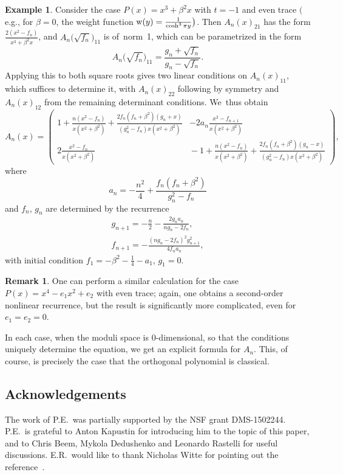\documentclass[10pt,a4paper]{amsart}
\theoremstyle{definition}
\newtheorem{Example}[Theorem]{Example}
\newtheorem{Remark}[Theorem]{Remark}
\numberwithin{equation}{section}
\begin{document}
\begin{Example}
 Consider the case $P(x)=x^3+\beta^2x$ with $t=-1$ and even trace $\big($e.g., for
 $\beta=0$, the weight function ${\rm w}(y)=\frac{1}{\cosh^3 \pi y}\big)$. Then $A_n(x)_{21}$
 has the form $\frac{2(x^2-f_n)}{x^3+\beta^2x}$, and $A_n\big(\sqrt{f_n}\big)_{11}$ is of~norm~1, which can be parametrized in the form
 \[
 A_n\big(\sqrt{f_n}\big)_{11} = \frac{g_n+\sqrt{f_n}}{g_n-\sqrt{f_n}}.
 \]
 Applying this to both square roots gives two linear conditions on
 $A_n(x)_{11}$, which suffices to determine it, with $A_n(x)_{22}$
 following by symmetry and $A_n(x)_{12}$ from the remaining determinant
 conditions. We~thus obtain
 \[
 A_n(x)
 =
 \begin{pmatrix}
 \displaystyle 1 \!+\! \frac{n(x^2\!-\!f_n)}{x(x^2\!+\!\beta^2)}
 \!+\! \frac{2f_n(f_n\!+\!\beta^2)(g_n\!+\!x)}{(g_n^2\!-\!f_n)x(x^2\!+\!\beta^2)}
 &\displaystyle
 -2 a_n \frac{x^2-f_{n+1}}{x(x^2+\beta^2)}
 \\[2ex]
 \displaystyle 2 \frac{x^2-f_n}{x(x^2+\beta^2)}
 &\displaystyle
 \!-\!1 \!+\! \frac{n(x^2\!-\!f_n)}{x(x^2\!+\!\beta^2)} \!+\! \frac{2f_n(f_n\!+\!\beta^2)(g_n\!-\!x)}{(g_n^2\!-\!f_n)x(x^2\!+\!\beta^2)}
 \end{pmatrix} ,
 \]
 where
 \[
 a_n = -\frac{n^2}{4}+\frac{f_n(f_n+\beta^2)}{g_n^2-f_n}
 \]
 and $f_n$, $g_n$ are determined by the recurrence
 \begin{gather*}
 g_{n+1} = -\frac{n}{2} - \frac{2g_na_n}{ng_n-2f_n},
 \\
 f_{n+1} = -\frac{(ng_n-2f_n)^2 g_{n+1}^2}{4f_na_n},
 \end{gather*}
 with initial condition
 $f_1 = -\beta^2-\frac{1}{4}-a_1$, $g_1 = 0$.
\end{Example}

\begin{Remark}
 One can perform a similar calculation for the case $P(x)=x^4-e_1x^2+e_2$
 with even trace; again, one obtains a second-order nonlinear recurrence,
 but the result is significantly more complicated, even for $e_1=e_2=0$.
\end{Remark}

In each case, when the moduli space is $0$-dimensional, so that the
conditions uniquely determine the equation, we get an explicit formula for
$A_n$. This, of course, is precisely the case that the orthogonal
polynomial is classical.

\subsection*{Acknowledgements} The work of P.E.\ was partially supported by the NSF grant DMS-1502244. P.E.\ is grateful to Anton Kapustin for introducing him to the topic of this paper, and to Chris Beem, Mykola Dedushenko and Leonardo Rastelli for useful discussions. E.R.\ would like to thank Nicholas Witte for pointing out the reference~\cite{Magnus}.
\end{document}
